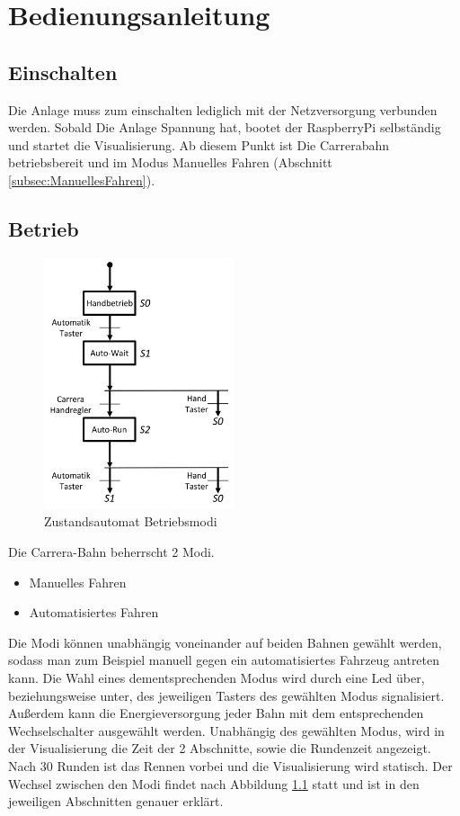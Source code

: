 \documentclass[a4paper, 11pt]{report}
\begin{document}

\chapter{Bedienungsanleitung}
\section{Einschalten}
	Die Anlage muss zum einschalten lediglich mit der Netzversorgung verbunden werden. Sobald Die Anlage Spannung hat, bootet der RaspberryPi selbständig und startet die Visualisierung. Ab diesem Punkt ist Die Carrerabahn betriebsbereit und im Modus Manuelles Fahren (Abschnitt \ref{subsec:ManuellesFahren}).
\section{Betrieb}
	\begin{figure}[ht]
		\centering
		\includegraphics[width=0.5\textwidth]{rec/modiAuswahl.png}
		\caption{Zustandsautomat Betriebsmodi}
		\label{img:Betriebsmodi}
	\end{figure}
	Die Carrera-Bahn beherrscht 2 Modi.
	\begin{itemize}
		\item Manuelles Fahren
		\item Automatisiertes Fahren
	\end{itemize}
	Die Modi können unabhängig voneinander auf beiden Bahnen gewählt werden, sodass man zum Beispiel manuell gegen ein automatisiertes Fahrzeug antreten kann. Die Wahl eines dementsprechenden Modus wird durch eine Led über, beziehungsweise unter, des jeweiligen Tasters des gewählten Modus signalisiert. Außerdem kann die Energieversorgung jeder Bahn mit dem entsprechenden Wechselschalter ausgewählt werden. Unabhängig des gewählten Modus, wird in der Visualisierung die Zeit der 2 Abschnitte, sowie die Rundenzeit angezeigt. Nach 30 Runden ist das Rennen vorbei und die Visualisierung wird statisch.
	Der Wechsel zwischen den Modi findet nach Abbildung \ref{img:Betriebsmodi} statt und ist in den jeweiligen Abschnitten genauer erklärt.
\end{document}
